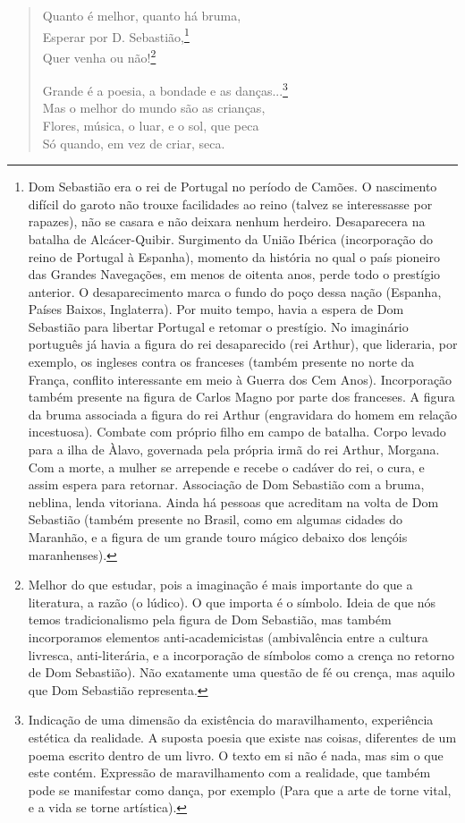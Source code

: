 \begin{verse}
Quanto é melhor, quanto há bruma, \\
Esperar por D. Sebastião,\footnote{Dom Sebastião era o rei de Portugal no período de Camões. O nascimento difícil do garoto não trouxe facilidades ao reino (talvez se interessasse por rapazes), não se casara e não deixara nenhum herdeiro. Desaparecera na batalha de Alcácer-Quibir. Surgimento da União Ibérica (incorporação do reino de Portugal à Espanha), momento da história no qual o país pioneiro das Grandes Navegações, em menos de oitenta anos, perde todo o prestígio anterior. O desaparecimento marca o fundo do poço dessa nação (Espanha, Países Baixos, Inglaterra). Por muito tempo, havia a espera de Dom Sebastião para libertar Portugal e retomar o prestígio. No imaginário português já havia a figura do rei desaparecido (rei Arthur), que lideraria, por exemplo, os ingleses contra os franceses (também presente no norte da França, conflito interessante em meio à Guerra dos Cem Anos). Incorporação também presente na figura de Carlos Magno por parte dos franceses. A figura da bruma associada a figura do rei Arthur (engravidara do homem em relação incestuosa). Combate com próprio filho em campo de batalha. Corpo levado para a ilha de Àlavo, governada pela própria irmã do rei Arthur, Morgana. Com a morte, a mulher se arrepende e recebe o cadáver do rei, o cura, e assim espera para retornar. Associação de Dom Sebastião com a bruma, neblina, lenda vitoriana. Ainda há pessoas que acreditam na volta de Dom Sebastião (também presente no Brasil, como em algumas cidades do Maranhão, e a figura de um grande touro mágico debaixo dos lençóis maranhenses).} \\
Quer venha ou não!\footnote{Melhor do que estudar, pois a imaginação é mais importante do que a literatura, a razão (o lúdico). O que importa é o símbolo. Ideia de que nós temos tradicionalismo pela figura de Dom Sebastião, mas também incorporamos elementos anti-academicistas (ambivalência entre a cultura livresca, anti-literária, e a incorporação de símbolos como a crença no retorno de Dom Sebastião). Não exatamente uma questão de fé ou crença, mas aquilo que Dom Sebastião representa.}

Grande é a poesia, a bondade e as danças...\footnote{Indicação de uma dimensão da existência do maravilhamento, experiência estética da realidade. A suposta poesia que existe nas coisas, diferentes de um poema escrito dentro de um livro. O texto em si não é nada, mas sim o que este contém. Expressão de maravilhamento com a realidade, que também pode se manifestar como dança, por exemplo (Para que a arte de torne vital, e a vida se torne artística).} \\
Mas o melhor do mundo são as crianças, \\
Flores, música, o luar, e o sol, que peca \\
Só quando, em vez de criar, seca.


\end{verse}
